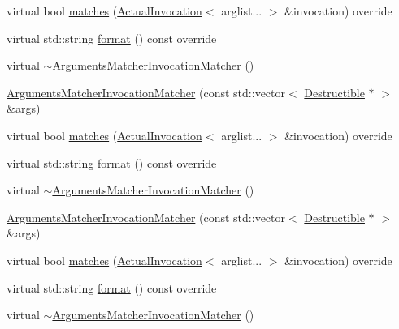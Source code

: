 \begin{DoxyCompactItemize}
\item 
virtual bool \mbox{\hyperlink{structfakeit_1_1ArgumentsMatcherInvocationMatcher_a7da0c96fb549a6bb4b944214514e4ca8}{matches}} (\mbox{\hyperlink{structfakeit_1_1ActualInvocation}{Actual\+Invocation}}$<$ arglist... $>$ \&invocation) override
\item 
virtual std\+::string \mbox{\hyperlink{structfakeit_1_1ArgumentsMatcherInvocationMatcher_a5174a0a696bbbc3090b4b1d7937c02f9}{format}} () const override
\item 
virtual \mbox{\hyperlink{structfakeit_1_1ArgumentsMatcherInvocationMatcher_a7674a20f37f1b19f7597eb24d9deb392}{$\sim$\+Arguments\+Matcher\+Invocation\+Matcher}} ()
\item 
\mbox{\hyperlink{structfakeit_1_1ArgumentsMatcherInvocationMatcher_aad6c81f17ede575178414c2c7581e800}{Arguments\+Matcher\+Invocation\+Matcher}} (const std\+::vector$<$ \mbox{\hyperlink{classfakeit_1_1Destructible}{Destructible}} $\ast$ $>$ \&args)
\item 
virtual bool \mbox{\hyperlink{structfakeit_1_1ArgumentsMatcherInvocationMatcher_a7da0c96fb549a6bb4b944214514e4ca8}{matches}} (\mbox{\hyperlink{structfakeit_1_1ActualInvocation}{Actual\+Invocation}}$<$ arglist... $>$ \&invocation) override
\item 
virtual std\+::string \mbox{\hyperlink{structfakeit_1_1ArgumentsMatcherInvocationMatcher_a5174a0a696bbbc3090b4b1d7937c02f9}{format}} () const override
\item 
virtual \mbox{\hyperlink{structfakeit_1_1ArgumentsMatcherInvocationMatcher_a7674a20f37f1b19f7597eb24d9deb392}{$\sim$\+Arguments\+Matcher\+Invocation\+Matcher}} ()
\item 
\mbox{\hyperlink{structfakeit_1_1ArgumentsMatcherInvocationMatcher_aad6c81f17ede575178414c2c7581e800}{Arguments\+Matcher\+Invocation\+Matcher}} (const std\+::vector$<$ \mbox{\hyperlink{classfakeit_1_1Destructible}{Destructible}} $\ast$ $>$ \&args)
\item 
virtual bool \mbox{\hyperlink{structfakeit_1_1ArgumentsMatcherInvocationMatcher_a7da0c96fb549a6bb4b944214514e4ca8}{matches}} (\mbox{\hyperlink{structfakeit_1_1ActualInvocation}{Actual\+Invocation}}$<$ arglist... $>$ \&invocation) override
\item 
virtual std\+::string \mbox{\hyperlink{structfakeit_1_1ArgumentsMatcherInvocationMatcher_a5174a0a696bbbc3090b4b1d7937c02f9}{format}} () const override
\item 
virtual \mbox{\hyperlink{structfakeit_1_1ArgumentsMatcherInvocationMatcher_a7674a20f37f1b19f7597eb24d9deb392}{$\sim$\+Arguments\+Matcher\+Invocation\+Matcher}} ()

\end{DoxyCompactItemize}
